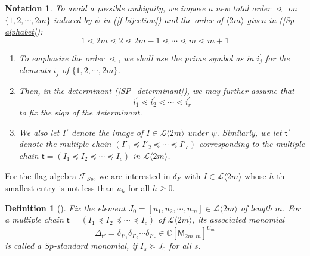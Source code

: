 \documentclass[11pt]{amsart}
\numberwithin{equation}{subsection}
\newtheorem{definition}[theorem]{Definition}
\newtheorem{notation}[theorem]{Notation}
\begin{document}
\begin{notation}\label{Sp-notation}
To avoid a possible ambiguity, we impose  
a new total order $\lessdot$ on $\{1, 2, \cdots, 2m \}$ induced by $\psi$ in (\ref{f-bijection})
and the order of $\langle 2m \rangle$ given in (\ref{Sp-alphabet}):
\begin{equation*}
 1 \lessdot 2m \lessdot 2 \lessdot 2m-1 \lessdot \cdots \lessdot m \lessdot m+1
\end{equation*}
\begin{enumerate}
\item To emphasize the order $\lessdot$, we shall use the prime symbol as in 
$i_{j}^{\prime}$ for the elements $i_j$ of $\{1, 2, \cdots, 2m\}$. 

\item Then, in the determinant (\ref{SP_determinant}), we may further assume that 
$$i_{1}^{\prime} \lessdot i_{2}^{\prime} \lessdot \cdots \lessdot i_{r}^{\prime}$$
to fix the sign of the determinant.

\item We also let $I'$ denote the image of $I \in \mathcal{L}\langle 2m \rangle$ 
under $\psi$. Similarly, we let $\mathsf{t}'$ denote the multiple chain 
$(I'_1 \preceq I'_2 \preceq \cdots \preceq I'_c)$ corresponding to the multiple chain 
$\mathsf{t}=(I_1 \preceq I_2 \preceq \cdots \preceq I_c)$ in $\mathcal{L}\langle 2m \rangle$.
\end{enumerate}
\end{notation}


\medskip

For the flag algebra $\mathcal{F}_{Sp}$, we are interested in ${\delta}_{I'}$ with 
$I \in \mathcal{L}\langle 2m \rangle$ whose $h$-th smallest entry is not less than 
$u_h$ for all $h \geq 0$. 


\begin{definition}[{\protect\cite{Be86, Ki08}}]\label{Sp-stm}
Fix the element $J_{0}=[u_1,u_2,\cdots ,u_m]\in \mathcal{L}\langle 2m \rangle$ of
length $m$. For a multiple chain 
$\mathsf{t}=(I_{1}\preceq I_{2}\preceq \cdots \preceq I_{c})$ of 
$\mathcal{L}\langle 2m \rangle$, its associated monomial
\begin{equation*}
{\Delta} _{\mathsf{t}'}={\delta} _{I'_{1}} {\delta} _{I'_{2}}\cdots {\delta} _{I'_{c}}\in 
\mathbb{C}[\mathsf{M}_{2m,m}]^{U_{m}}
\end{equation*}
is called a ${Sp}$-\textit{standard monomial}, if $I_{s}\succeq J_{0}$ for all $s$. 
\end{definition}
\end{document}
